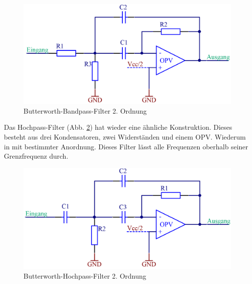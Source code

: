 \begin{figure} [H]
	\centering
	\includegraphics[width=1\textwidth]{img/Print4/BPFilter-Butterworth2Ordnung.PNG}
	\caption{Butterworth-Bandpass-Filter 2. Ordnung}
	\label {fig:8.4.1.2}
\end{figure}
Das Hochpass-Filter (Abb. \ref{fig:8.4.1.3}) hat wieder eine ähnliche Konstruktion.
Dieses besteht aus drei Kondensatoren, zwei Widerständen und einem OPV.
Wiederum in mit bestimmter Anordnung.
Dieses Filter lässt alle Frequenzen oberhalb seiner Grenzfrequenz durch.
\begin{figure} [H]
	\centering	
	\includegraphics[width=1\textwidth]{img/Print4/HPFilter-Butterworth2Ordnung.PNG}
	\caption{Butterworth-Hochpass-Filter 2. Ordnung}
	\label {fig:8.4.1.3}
\end{figure}

